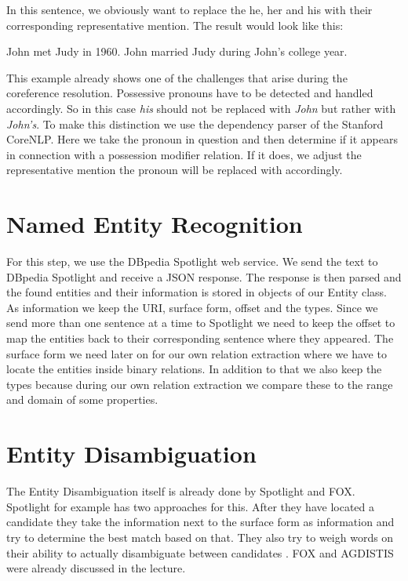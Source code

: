 \documentclass[runningheads]{llncs}
\begin{document}
In this sentence, we obviously want to replace the he, her and his with their corresponding representative mention.
The result would look like this: 

\begin{example} John met Judy in 1960. John married Judy during John's college year. \end{example}


This example already shows one of the challenges that arise during the coreference resolution. Possessive pronouns have to be detected and handled accordingly. So in this case \textit{his} should not be replaced with \textit{John} but rather with \textit{John's}. To make this distinction we use the dependency parser \cite{parser} of the Stanford CoreNLP. Here we take the pronoun in question and then determine if it appears in connection with a possession modifier relation. If it does, we adjust the representative mention the pronoun will be replaced with accordingly.



\section{Named Entity Recognition}
For this step, we use the DBpedia Spotlight web service. We send the text to DBpedia Spotlight and receive a JSON response. The response is then parsed and the found entities and their information is stored in objects of our Entity class. As information we keep the URI, surface form, offset and the types. Since we send more than one sentence at a time to Spotlight we need to keep the offset to map the entities back to their corresponding sentence where they appeared. The surface form we need later on for our own relation extraction where we have to locate the entities inside binary relations. In addition to that we also keep the types because during our own relation extraction we compare these to the range and domain of some properties.





\section{Entity Disambiguation}
The Entity Disambiguation itself is already done by Spotlight and FOX. Spotlight for example has two approaches for this.
After they have located a candidate they take the information next to the surface form as information and try to determine the best match based on that. They also try to weigh words on their ability to actually disambiguate between candidates \cite{disambiguate}. FOX and AGDISTIS \cite{agdistis} \cite{agdistis2} were already discussed in the lecture.
\end{document}
